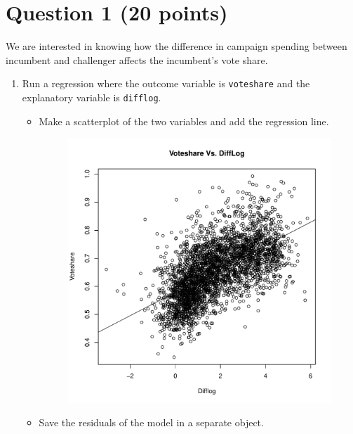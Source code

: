 \documentclass[12pt,letterpaper]{article}
\begin{document}
\section*{Question 1 (20 points)}
\vspace{.25cm}
\noindent We are interested in knowing how the difference in campaign spending between incumbent and challenger affects the incumbent's vote share. 
	\begin{enumerate}
		\item Run a regression where the outcome variable is \texttt{voteshare} and the explanatory variable is \texttt{difflog}.	\vspace{5cm}
			 
			
			\begin{itemize}
		\item Make a scatterplot of the two variables and add the regression line. 	

			\begin{figure}[h!]\centering
			\caption{\footnotesize
			}\vspace{-1cm}
			\includegraphics[width=.75\textwidth]{plot_Q1_2.pdf}\\
			\end{figure}
			\end{itemize}

	\begin{itemize}
		\item Save the residuals of the model in a separate object.	


\end{itemize}
\end{enumerate}
\end{document}

